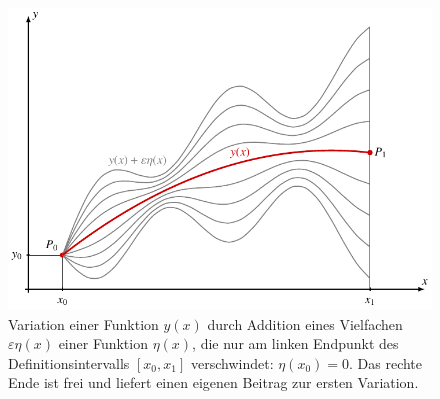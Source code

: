 %
%
%
\begin{figure}
\centering
\includegraphics{chapters/020-variation/images/variation1.pdf}
\caption{Variation einer Funktion $y(x)$ durch Addition eines Vielfachen
$\varepsilon\eta(x)$ einer Funktion $\eta(x)$, die nur am linken Endpunkt
des Definitionsintervalls $[x_0,x_1]$ verschwindet: $\eta(x_0)=0$.
Das rechte Ende ist frei und liefert einen eigenen Beitrag zur ersten
Variation.
\label{buch:variation:fig:variation1}}
\end{figure}
